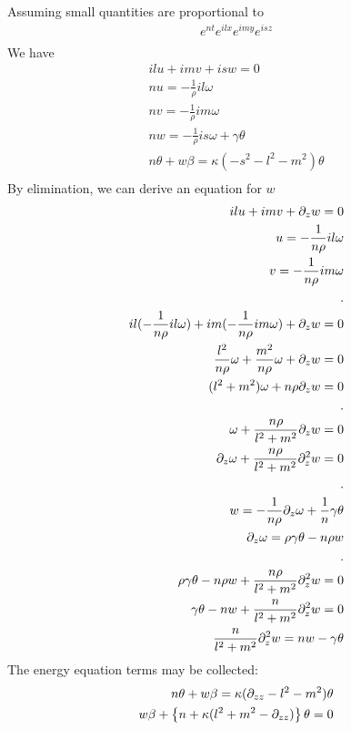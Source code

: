 \documentclass[11pt]{article}
\begin{document}
Assuming small quantities are proportional to
\begin{equation}\begin{aligned}
e^{nt} e^{ilx} e^{imy} e^{isz} \\
\end{aligned} \end{equation}
We have
\begin{equation}\begin{aligned}
il u + im v + is w = 0 \\
n u = -\frac{1}{\rho} il \omega \\
n v = -\frac{1}{\rho} im \omega \\
n w = -\frac{1}{\rho} is \omega + \gamma \theta \\
n \theta + w \beta = \kappa (-s^2-l^2 -m^2) \theta \\
\end{aligned} \end{equation}
By elimination, we can derive an equation for $w$
\begin{equation}\begin{aligned}
il u + im v + \PD_z w = 0 \\
u = -\frac{1}{n \rho} il \omega \\
v = -\frac{1}{n \rho} im \omega \\
. \\
il (-\frac{1}{n \rho} il \omega) + im (-\frac{1}{n \rho} im \omega) + \PD_z w = 0 \\
\frac{l^2}{n \rho} \omega + \frac{m^2}{n \rho} \omega + \PD_z w = 0 \\
(l^2 + m^2)\omega + n \rho \PD_z w = 0 \\
. \\
\omega + \frac{n \rho}{l^2 + m^2} \PD_z w = 0 \\
\PD_z \omega + \frac{n \rho}{l^2 + m^2} \PD_z^2 w = 0 \\
%
. \\
w = -\frac{1}{n \rho} \PD_z \omega + \frac{1}{n}\gamma \theta \\
\PD_z \omega = \rho \gamma \theta - n \rho w \\
. \\
\rho \gamma \theta - n \rho w + \frac{n \rho}{l^2 + m^2} \PD_z^2 w = 0 \\
\gamma \theta - n w + \frac{n}{l^2 + m^2} \PD_z^2 w = 0 \\
\frac{n}{l^2 + m^2} \PD_z^2 w = n w - \gamma \theta \\
\end{aligned} \end{equation}
The energy equation terms may be collected:
\begin{equation}\begin{aligned}
n \theta + w \beta = \kappa (\partial_{zz}-l^2 -m^2) \theta \\
w \beta + \left\{n + \kappa (l^2 +m^2-\partial_{zz}) \right\} \theta = 0 \\
\end{aligned} \end{equation}
\end{document}
